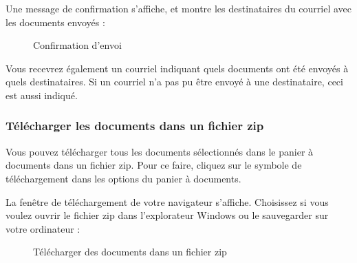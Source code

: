 \vspace{\baselineskip}

Une message de confirmation s'affiche, et montre les destinataires du courriel avec les documents envoyés :

\begin{figure}[H]
\caption{Confirmation d'envoi}
\end{figure}

Vous recevrez également un courriel indiquant quels documents ont été envoyés à quels destinataires. Si un courriel n'a pas pu être envoyé à une destinataire, ceci est aussi indiqué.

\vspace{\baselineskip}

\subsubsection{Télécharger les documents dans un fichier zip}

Vous pouvez télécharger tous les documents sélectionnés dans le panier à documents dans un fichier zip. Pour ce faire, cliquez sur le symbole de téléchargement dans les options du panier à documents.

\vspace{\baselineskip}

La fenêtre de téléchargement de votre navigateur s'affiche. Choisissez si vous voulez ouvrir le fichier zip dans l'explorateur Windows ou le sauvegarder sur votre ordinateur :

\begin{figure}[H]
\caption{Télécharger des documents dans un fichier zip}
\end{figure}

